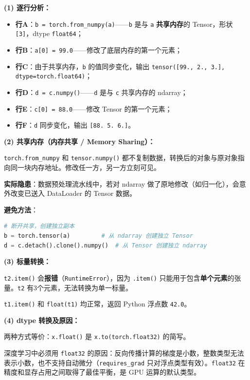 \documentclass[a4paper,11pt]{ctexart}
\begin{document}
\begin{solutionbox}[参考答案与详细解析]
    \textbf{(1) 逐行分析：}

    \begin{itemize}
        \item \textbf{行A}：\texttt{b = torch.from\_numpy(a)}——\texttt{b} 是与 \texttt{a} \textbf{共享内存}的 Tensor，形状 \texttt{[3]}，dtype \texttt{float64}；
        \item \textbf{行B}：\texttt{a[0] = 99.0}——修改了底层内存的第一个元素；
        \item \textbf{行C}：由于共享内存，\texttt{b} 的值同步变化，输出 \texttt{tensor([99., 2., 3.], dtype=torch.float64)}；
        \item \textbf{行D}：\texttt{d = c.numpy()}——\texttt{d} 是与 \texttt{c} 共享内存的 ndarray；
        \item \textbf{行E}：\texttt{c[0] = 88.0}——修改 Tensor 的第一个元素；
        \item \textbf{行F}：\texttt{d} 同步变化，输出 \texttt{[88. 5. 6.]}。
    \end{itemize}

    \textbf{(2) 共享内存（内存共享 / Memory Sharing）：}

    \texttt{torch.from\_numpy} 和 \texttt{tensor.numpy()} 都不复制数据，转换后的对象与原对象指向同一块内存地址。修改任一方，另一方立刻可见。

    \textbf{实际隐患}：数据预处理流水线中，若对 ndarray 做了原地修改（如归一化），会意外改变已送入 DataLoader 的 Tensor 数据。

    \textbf{避免方法}：
    \begin{lstlisting}[language=Python]
# 断开共享，创建独立副本
b = torch.tensor(a)         # 从 ndarray 创建独立 Tensor
d = c.detach().clone().numpy()  # 从 Tensor 创建独立 ndarray
    \end{lstlisting}

    \textbf{(3) 标量转换：}

    \texttt{t2.item()} 会\textbf{报错}（\texttt{RuntimeError}），因为 \texttt{.item()} 只能用于包含\textbf{单个元素}的张量。\texttt{t2} 有3个元素，无法转换为单一标量。

    \texttt{t1.item()} 和 \texttt{float(t1)} 均正常，返回 Python 浮点数 \texttt{42.0}。

    \textbf{(4) dtype 转换及原因：}

    两种方式等价：\texttt{x.float()} 是 \texttt{x.to(torch.float32)} 的简写。

    深度学习中必须用 \texttt{float32} 的原因：反向传播计算的梯度是小数，整数类型无法表示小数，也不支持自动微分（\texttt{requires\_grad} 只对浮点类型有效）。\texttt{float32} 在精度和显存占用之间取得了最佳平衡，是 GPU 运算的默认类型。
\end{solutionbox}
\end{document}
